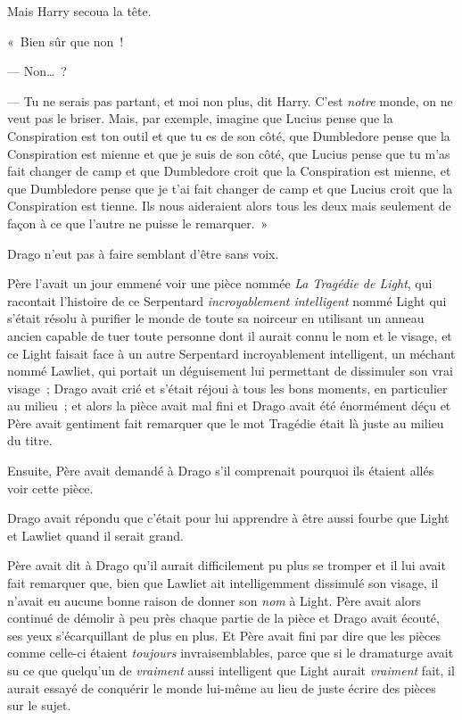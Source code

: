 Mais Harry secoua la tête.

«~Bien sûr que non~!

--- Non…~?

--- Tu ne serais pas partant, et moi non plus, dit Harry. C'est \emph{notre} monde, on ne veut pas le briser. Mais, par exemple, imagine que Lucius pense que la Conspiration est ton outil et que tu es de son côté, que Dumbledore pense que la Conspiration est mienne et que je suis de son côté, que Lucius pense que tu m'as fait changer de camp et que Dumbledore croit que la Conspiration est mienne, et que Dumbledore pense que je t'ai fait changer de camp et que Lucius croit que la Conspiration est tienne. Ils nous aideraient alors tous les deux mais seulement de façon à ce que l'autre ne puisse le remarquer.~»

Drago n'eut pas à faire semblant d'être sans voix.

Père l'avait un jour emmené voir une pièce nommée \emph{La Tragédie de Light}, qui racontait l'histoire de ce Serpentard \emph{incroyablement intelligent} nommé Light qui s'était résolu à purifier le monde de toute sa noirceur en utilisant un anneau ancien capable de tuer toute personne dont il aurait connu le nom et le visage, et ce Light faisait face à un autre Serpentard incroyablement intelligent, un méchant nommé Lawliet, qui portait un déguisement lui permettant de dissimuler son vrai visage~; Drago avait crié et s'était réjoui à tous les bons moments, en particulier au milieu~; et alors la pièce avait mal fini et Drago avait été énormément déçu et Père avait gentiment fait remarquer que le mot Tragédie était là juste au milieu du titre.

Ensuite, Père avait demandé à Drago s'il comprenait pourquoi ils étaient allés voir cette pièce.

Drago avait répondu que c'était pour lui apprendre à être aussi fourbe que Light et Lawliet quand il serait grand.

Père avait dit à Drago qu'il aurait difficilement pu plus se tromper et il lui avait fait remarquer que, bien que Lawliet ait intelligemment dissimulé son visage, il n'avait eu aucune bonne raison de donner son \emph{nom} à Light. Père avait alors continué de démolir à peu près chaque partie de la pièce et Drago avait écouté, ses yeux s'écarquillant de plus en plus. Et Père avait fini par dire que les pièces comme celle-ci étaient \emph{toujours} invraisemblables, parce que si le dramaturge avait su ce que quelqu'un de \emph{vraiment} aussi intelligent que Light aurait \emph{vraiment} fait, il aurait essayé de conquérir le monde lui-même au lieu de juste écrire des pièces sur le sujet.

